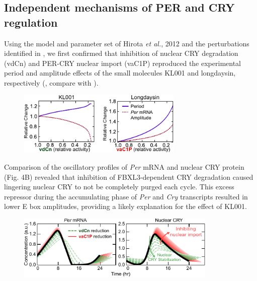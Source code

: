 \subsection{Independent mechanisms of PER and CRY regulation}
Using the model and parameter set of Hirota {\it et al.}, 2012 \cite{Hirota2012} and the perturbations identified in , we first confirmed that inhibition of nuclear CRY degradation (vdCn) and PER-CRY nuclear import (vaC1P) reproduced the experimental period and amplitude effects of the small molecules KL001 and longdaysin, respectively (, compare with ). 

\begin{figure}[h]
  \centering
  \includegraphics[width=0.7\textwidth]{chap4/figures/fig4a.pdf}
  \label{fig:44a}
\end{figure}

Comparison of the oscillatory profiles of {\it Per} mRNA and nuclear CRY protein (Fig. 
4B) revealed that inhibition of FBXL3-dependent CRY degradation caused lingering nuclear CRY to not be completely purged each cycle. 
 This excess repressor during the accumulating phase of {\it Per} and {\it Cry} transcripts resulted in lower E box amplitudes, providing a likely explanation for the effect of KL001.

\begin{figure}[h]
  \centering
  \includegraphics[width=0.85\textwidth]{chap4/figures/fig4b.pdf}
  \label{fig:44b}
\end{figure}

